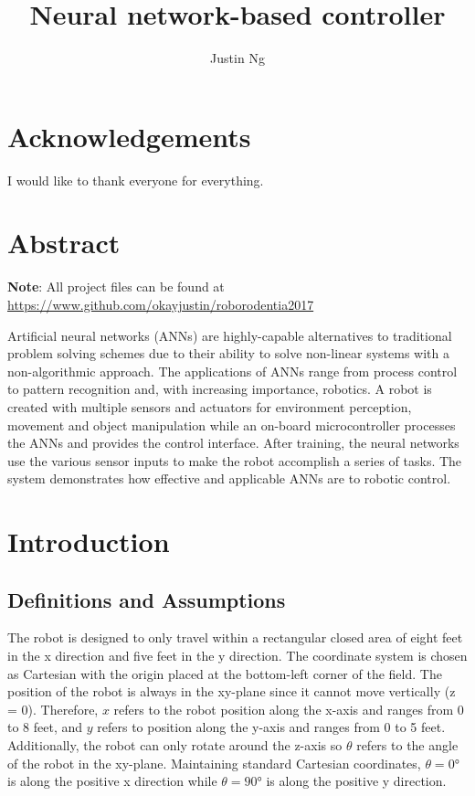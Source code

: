\documentclass[12pt,letterpaper,titlepage]{report}
\title{Neural network-based controller}
\author{Justin Ng}
\begin{document}

\newpage
{}
\tableofcontents
\listoffigures
\listoftables


\chapter*{Acknowledgements}
I would like to thank everyone for everything.


\chapter*{Abstract}
\textbf{Note}: All project files can be found at \url{https://www.github.com/okayjustin/roborodentia2017} \

Artificial neural networks (ANNs) are highly-capable alternatives to traditional problem solving schemes due to their ability to solve non-linear systems with a non-algorithmic approach. The applications of ANNs range from process control to pattern recognition and, with increasing importance, robotics. A robot is created with multiple sensors and actuators for environment perception, movement and object manipulation while an on-board microcontroller processes the ANNs and provides the control interface. After training, the neural networks use the various sensor inputs to make the robot accomplish a series of tasks. The system demonstrates how effective and applicable ANNs are to robotic control. 


\chapter{Introduction}
\section{Definitions and Assumptions}
The robot is designed to only travel within a rectangular closed area of eight feet in the x direction and five feet in the y direction. The coordinate system is chosen as Cartesian with the origin placed at the bottom-left corner of the field. The position of the robot is always in the xy-plane since it cannot move vertically (z = 0). Therefore, $x$ refers to the robot position along the x-axis and ranges from 0 to 8 feet, and $y$ refers to position along the y-axis and ranges from 0 to 5 feet. Additionally, the robot can only rotate around the z-axis so $\theta$ refers to the angle of the robot in the xy-plane. Maintaining standard Cartesian coordinates, $\theta=\ang{0}$ is along the positive x direction while $\theta=\ang{90}$ is along the positive y direction.
\end{document}

